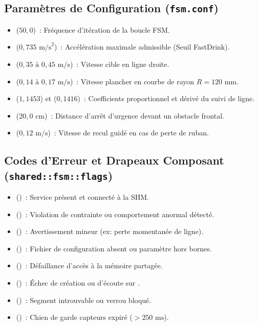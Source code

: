 \subsection{Paramètres de Configuration (\texttt{fsm.conf})}
\begin{itemize}
    \item {} ($50{,}0$)~: Fréquence d'itération de la boucle FSM.
    \item {} ($0{,}735\text{ m/s}^2$)~: Accélération maximale admissible (Seuil FastDrink).
    \item {} ($0{,}35\text{ à } 0{,}45\text{ m/s}$)~: Vitesse cible en ligne droite.
    \item {} ($0{,}14\text{ à } 0{,}17\text{ m/s}$)~: Vitesse plancher en courbe de rayon $R = 120\text{ mm}$.
    \item {} ($1{,}1453$) et  ($0{,}1416$)~: Coefficients proportionnel et dérivé du suivi de ligne.
    \item {} ($20{,}0\text{ cm}$)~: Distance d'arrêt d'urgence devant un obstacle frontal.
    \item {} ($0{,}12\text{ m/s}$)~: Vitesse de recul guidé en cas de perte de ruban.
\end{itemize}

\subsection{Codes d'Erreur et Drapeaux Composant (\texttt{shared::fsm::flags})}
\begin{itemize}
    \item {} ()~: Service présent et connecté à la SHM.
    \item {} ()~: Violation de contrainte ou comportement anormal détecté.
    \item {} ()~: Avertissement mineur (ex: perte momentanée de ligne).
    \item {} ()~: Fichier de configuration absent ou paramètre hors bornes.
    \item {} ()~: Défaillance d'accès à la mémoire partagée.
    \item {} ()~: Échec de création ou d'écoute sur .
    \item {} ()~: Segment  introuvable ou verrou bloqué.
    \item {} ()~: Chien de garde capteurs expiré ($> 250\text{ ms}$).
\end{itemize}

